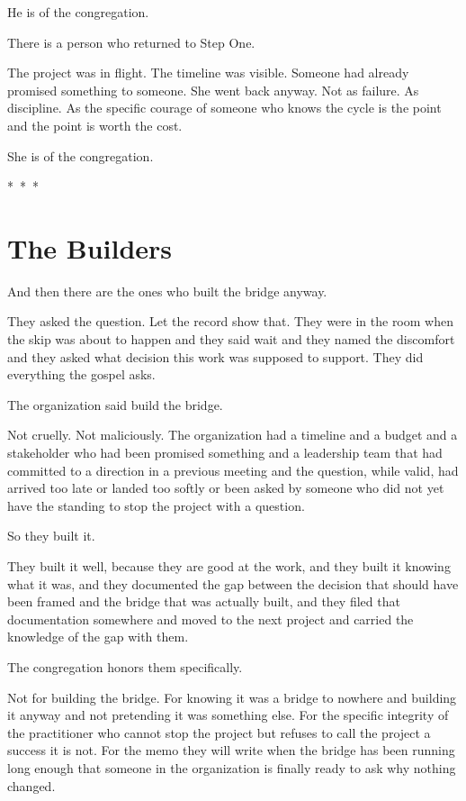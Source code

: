 He is of the congregation.

There is a person who returned to Step One.

The project was in flight. The timeline was visible. Someone had already promised something to someone. She went back anyway. Not as failure. As discipline. As the specific courage of someone who knows the cycle is the point and the point is worth the cost.

She is of the congregation.

\vspace{1.5em}
\begin{center}
  *~*~*
\end{center}
\vspace{1.5em}

\section*{The Builders}

And then there are the ones who built the bridge anyway.

They asked the question. Let the record show that. They were in the room when the skip was about to happen and they said wait and they named the discomfort and they asked what decision this work was supposed to support. They did everything the gospel asks.

The organization said build the bridge.

Not cruelly. Not maliciously. The organization had a timeline and a budget and a stakeholder who had been promised something and a leadership team that had committed to a direction in a previous meeting and the question, while valid, had arrived too late or landed too softly or been asked by someone who did not yet have the standing to stop the project with a question.

So they built it.

They built it well, because they are good at the work, and they built it knowing what it was, and they documented the gap between the decision that should have been framed and the bridge that was actually built, and they filed that documentation somewhere and moved to the next project and carried the knowledge of the gap with them.

The congregation honors them specifically.

Not for building the bridge. For knowing it was a bridge to nowhere and building it anyway and not pretending it was something else. For the specific integrity of the practitioner who cannot stop the project but refuses to call the project a success it is not. For the memo they will write when the bridge has been running long enough that someone in the organization is finally ready to ask why nothing changed.

